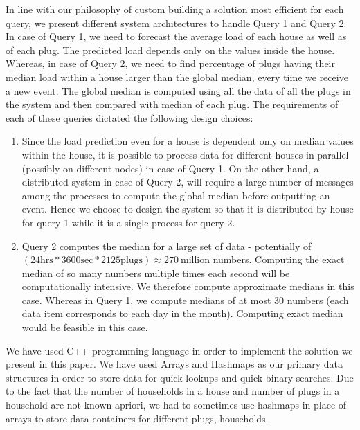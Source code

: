 In line with our philosophy of custom building a solution most efficient for each query, we present different system architectures to handle Query 1 and Query 2. In case of Query 1, we need to forecast the average load of each house as well as of each plug. The predicted load depends only on the values inside the house. Whereas, in case of Query 2, we need to find percentage of plugs having their median load within a house larger than the global median, every time we receive a new event. The global median is computed using all the data of all the plugs in the system and then compared with median of each plug. The requirements of each of these queries dictated the following design choices:

\begin{enumerate}
\item Since the load prediction even for a house is dependent only on median values within the house, it is possible to process data for different houses in parallel (possibly on different nodes) in case of Query 1. On the other hand, a distributed system in case of Query 2, will require a large number of messages among the processes to compute the global median before outputting an event. Hence we choose to design the system so that it is distributed by house for query 1 while it is a single process for query 2. 
\item Query 2 computes the median for a large set of data - potentially  of $(24 \mbox{hrs} * 3600 \mbox{sec} * 2125 \mbox{plugs}) \approx 270 \ \mbox{million}$ numbers. Computing the exact median of so many numbers multiple times each second will be computationally intensive. We therefore compute approximate medians in this case. Whereas in Query 1, we compute medians of at most 30 numbers (each data item corresponds to each day in the month). Computing exact median would be feasible in this case.
\end{enumerate}

We have used C++ programming language in order to implement the solution we present in this paper. We have used Arrays and Hashmaps as our primary data structures in order to store data for quick lookups and quick binary searches.  Due to the fact that the number of households in a house and number of plugs in a household are not known apriori, we had to sometimes use hashmaps in place of arrays to store data containers for different plugs, households.

